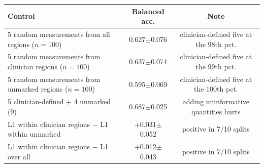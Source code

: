 \begin{tabular}{lcc}
\toprule
Control & Balanced acc. & Note \\
\midrule
5 random measurements from all regions ($n{=}100$) & 0.627$\pm$0.076 & clinician-defined five at the 98th pct. \\
5 random measurements from clinician regions ($n{=}100$) & 0.637$\pm$0.074 & clinician-defined five at the 99th pct. \\
5 random measurements from unmarked regions ($n{=}100$) & 0.595$\pm$0.069 & clinician-defined five at the 100th pct. \\
5 clinician-defined + 4 unmarked (9) & 0.687$\pm$0.025 & adding uninformative quantities hurts \\
L1 within clinician regions $-$ L1 within unmarked & +0.031$\pm$0.052 & positive in 7/10 splits \\
L1 within clinician regions $-$ L1 over all & +0.012$\pm$0.043 & positive in 7/10 splits \\
\bottomrule
\end{tabular}
